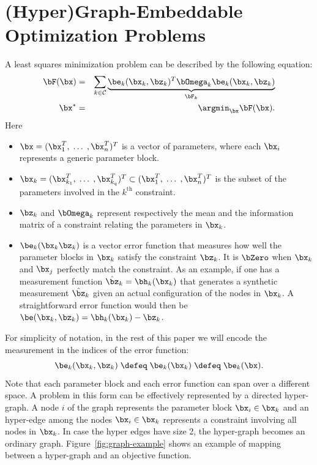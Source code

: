 \documentclass[a4paper]{article}
\begin{document}
\section{(Hyper)Graph-Embeddable Optimization Problems}
A least squares minimization problem can be described by the following equation:
\begin{eqnarray}
\bF(\bx)&=& \sum_{k \in\mathcal{C}}
\underbrace{\be_k(\bx_k, \bz_{k})^T \bOmega_{k} \be_k(\bx_k, \bz_{k})}_{\bF_{k}}
\label{eq:sumOfFactors}\\
\bx^*&=&\argmin_{\bx} \bF(\bx).
\label{eq:toMinimize}
\end{eqnarray}
Here
\begin{itemize}
  \item  $\bx=(\bx_1^T,\;\ldots\;,\bx_n^T)^T$ is a vector of
    parameters, where each $\bx_i$ represents a generic parameter block.
  \item $\bx_k=(\bx_{k_1}^T,\;\ldots\;,\bx_{k_q}^T)^T \subset
    (\bx_1^T,\;\ldots\;,\bx_n^T)^T$ is the subset of the parameters
    involved in the $k^\mathrm{th}$ constraint.  
  \item $\bz_{k}$ and $\bOmega_{k}$ represent 
    respectively the mean and the information matrix of a constraint
    relating the parameters in $\bx_k$.
  \item $\be_k(\bx_k \bz_{k})$ is a vector error function
    that measures how well the parameter blocks in $\bx_k$ satisfy the
    constraint $\bz_{k}$. It is $\bZero$ when $\bx_k$ and $\bx_j$
    perfectly match the constraint.  As an example, if one has a
    measurement function $\hat \bz_k = \bh_k(\bx_k)$ that generates a
    synthetic measurement $\hat \bz_k$ given an actual configuration
    of the nodes in $\bx_k$.  A straightforward error function would
    then be $\be(\bx_k, \bz_{k}) = \bh_k(\bx_k) - \bz_k$.
\end{itemize}
For simplicity of notation, in the rest of this paper we will encode
the measurement in the indices of the error function:
\begin{equation}
\be_k(\bx_k, \bz_{k}) \; \defeq \; \be_{k}(\bx_k) \; \defeq \; \be_{k}(\bx).
\end{equation}
Note that each parameter block and each error
function can span over a different space.  A problem in this form can
be effectively represented by a directed hyper-graph. A node $i$ of
the graph represents the parameter block $\bx_i \in \bx_k$ and an
hyper-edge among the nodes $\bx_{i} \in \bx_k $ represents a
constraint involving all nodes in $\bx_k$. In case the hyper edges
have size 2, the hyper-graph becomes an ordinary graph.
Figure~\ref{fig:graph-example} shows an
example of mapping between a hyper-graph and an objective function.
\end{document}
